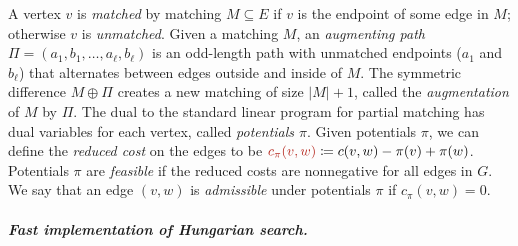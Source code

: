 \documentclass[a4paper,UKenglish]{socg-lipics-v2018}
\makeatletter
\def\abs#1{\mathopen| #1 \mathclose|}		%
\def\norm#1{\mathopen\| #1 \mathclose\|}	%
\theoremstyle{plain}
\numberwithin{figure}{section}
\renewcommand{\paragraph}{\subparagraph}
\def\EMPH#1{\textcolor{BrickRed}{{\emph{#1}}}}
\def\n@te#1{\textsf{\boldmath \textbf{$\langle\!\langle$#1$\rangle\!\rangle$}}\leavevmode}
\def\note#1{\textcolor{red}{\n@te{#1}}}
\makeatother
\begin{document}

A vertex $v$ is \EMPH{matched} by matching $M \subseteq E$ if $v$ is the endpoint of some edge in $M$;
otherwise $v$ is \EMPH{unmatched}.
Given a matching $M$, an \EMPH{augmenting path}
$\Pi = (a_1, b_1, \ldots, a_\ell, b_\ell)$ is an odd-length path with unmatched
endpoints ($a_1$ and $b_\ell$) that alternates between edges outside and inside of $M$.
The symmetric difference $M \oplus \Pi$ creates a new matching of size $\abs{M}+1$, called the \EMPH{augmentation} of $M$ by $\Pi$.
%
The dual to the standard linear program for partial matching has dual variables
for each vertex, called \EMPH{potentials $\pi$}.
Given potentials $\pi$, we can define the \EMPH{reduced cost} on the edges to be
$\EMPH{$c_\pi(v, w)$} \coloneqq c(v, w) - \pi(v) + \pi(w)$.
Potentials $\pi$ are \EMPH{feasible} if the reduced costs are nonnegative for all edges in $G$.
We say that an edge $(v, w)$ is \EMPH{admissible} under potentials $\pi$ if $c_\pi(v, w) = 0$.

\paragraph{Fast implementation of Hungarian search.}
\end{document}
